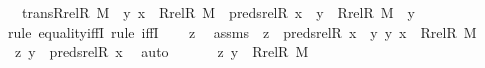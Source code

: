 \begin{isabellebody}
\ \ {\isachardoublequoteopen}trans{\isacharparenleft}{\kern0pt}Rrel{\isacharparenleft}{\kern0pt}R{\isacharcomma}{\kern0pt}\ M{\isacharparenright}{\kern0pt}{\isacharparenright}{\kern0pt}\ {\isasymLongrightarrow}\ {\isacharless}{\kern0pt}y{\isacharcomma}{\kern0pt}\ x{\isachargreater}{\kern0pt}\ {\isasymin}\ Rrel{\isacharparenleft}{\kern0pt}R{\isacharcomma}{\kern0pt}\ M{\isacharparenright}{\kern0pt}\ {\isasymLongrightarrow}\ preds{\isacharunderscore}{\kern0pt}rel{\isacharparenleft}{\kern0pt}R{\isacharcomma}{\kern0pt}\ x{\isacharparenright}{\kern0pt}\ {\isacharminus}{\kern0pt}{\isacharbackquote}{\kern0pt}{\isacharbackquote}{\kern0pt}\ {\isacharbraceleft}{\kern0pt}y{\isacharbraceright}{\kern0pt}\ {\isacharequal}{\kern0pt}\ Rrel{\isacharparenleft}{\kern0pt}R{\isacharcomma}{\kern0pt}\ M{\isacharparenright}{\kern0pt}\ {\isacharminus}{\kern0pt}{\isacharbackquote}{\kern0pt}{\isacharbackquote}{\kern0pt}\ {\isacharbraceleft}{\kern0pt}y{\isacharbraceright}{\kern0pt}{\isachardoublequoteclose}\ \isanewline
%
\isadelimproof
%
\endisadelimproof
%
\isatagproof
{}\isamarkupfalse%
{\isacharparenleft}{\kern0pt}rule\ equality{\isacharunderscore}{\kern0pt}iffI{\isacharcomma}{\kern0pt}\ rule\ iffI{\isacharparenright}{\kern0pt}\isanewline
\ \ \isamarkupfalse%
\ z\ \isamarkupfalse%
\ assms\ {\isacharcolon}{\kern0pt}\ {\isachardoublequoteopen}z\ {\isasymin}\ preds{\isacharunderscore}{\kern0pt}rel{\isacharparenleft}{\kern0pt}R{\isacharcomma}{\kern0pt}\ x{\isacharparenright}{\kern0pt}\ {\isacharminus}{\kern0pt}{\isacharbackquote}{\kern0pt}{\isacharbackquote}{\kern0pt}\ {\isacharbraceleft}{\kern0pt}y{\isacharbraceright}{\kern0pt}{\isachardoublequoteclose}\ {\isachardoublequoteopen}{\isacharless}{\kern0pt}y{\isacharcomma}{\kern0pt}\ x{\isachargreater}{\kern0pt}\ {\isasymin}\ Rrel{\isacharparenleft}{\kern0pt}R{\isacharcomma}{\kern0pt}\ M{\isacharparenright}{\kern0pt}{\isachardoublequoteclose}\isanewline
\ \ \isamarkupfalse%
\ \isamarkupfalse%
\ {\isachardoublequoteopen}{\isacharless}{\kern0pt}z{\isacharcomma}{\kern0pt}\ y{\isachargreater}{\kern0pt}\ {\isasymin}\ preds{\isacharunderscore}{\kern0pt}rel{\isacharparenleft}{\kern0pt}R{\isacharcomma}{\kern0pt}\ x{\isacharparenright}{\kern0pt}{\isachardoublequoteclose}\ \isamarkupfalse%
\ auto\ \isanewline
\ \ \isamarkupfalse%
\ \isamarkupfalse%
\ {\isachardoublequoteopen}{\isacharless}{\kern0pt}z{\isacharcomma}{\kern0pt}\ y{\isachargreater}{\kern0pt}\ {\isasymin}\ Rrel{\isacharparenleft}{\kern0pt}R{\isacharcomma}{\kern0pt}\ M{\isacharparenright}{\kern0pt}{\isachardoublequoteclose}\ \isanewline

\end{isabellebody}
